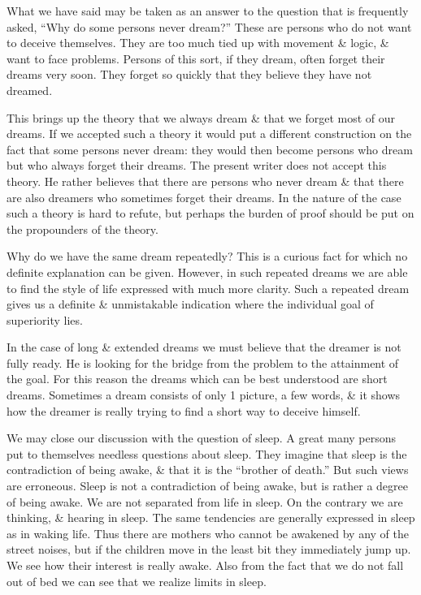 \documentclass{article}
\begin{document}
What we have said may be taken as an answer to the question that is frequently asked, ``Why do some persons never dream?'' These are persons who do not want to deceive themselves. They are too much tied up with movement \& logic, \& want to face problems. Persons of this sort, if they dream, often forget their dreams very soon. They forget so quickly that they believe they have not dreamed.

This brings up the theory that we always dream \& that we forget most of our dreams. If we accepted such a theory it would put a different construction on the fact that some persons never dream: they would then become persons who dream but who always forget their dreams. The present writer does not accept this theory. He rather believes that there are persons who never dream \& that there are also dreamers who sometimes forget their dreams. In the nature of the case such a theory is hard to refute, but perhaps the burden of proof should be put on the propounders of the theory.

Why do we have the same dream repeatedly? This is a curious fact for which no definite explanation can be given. However, in such repeated dreams we are able to find the style of life expressed with much more clarity. Such a repeated dream gives us a definite \& unmistakable indication where the individual goal of superiority lies.

In the case of long \& extended dreams we must believe that the dreamer is not fully ready. He is looking for the bridge from the problem to the attainment of the goal. For this reason the dreams which can be best understood are short dreams. Sometimes a dream consists of only 1 picture, a few words, \& it shows how the dreamer is really trying to find a short way to deceive himself.

We may close our discussion with the question of sleep. A great many persons put to themselves needless questions about sleep. They imagine that sleep is the contradiction of being awake, \& that it is the ``brother of death.'' But such views are erroneous. Sleep is not a contradiction of being awake, but is rather a degree of being awake. We are not separated from life in sleep. On the contrary we are thinking, \& hearing in sleep. The same tendencies are generally expressed in sleep as in waking life. Thus there are mothers who cannot be awakened by any of the street noises, but if the children move in the least bit they immediately jump up. We see how their interest is really awake. Also from the fact that we do not fall out of bed we can see that we realize limits in sleep.
\end{document}
